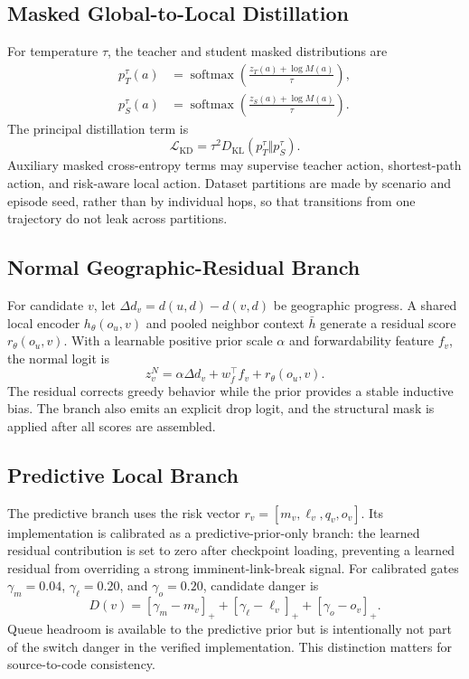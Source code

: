 \documentclass{ieeeaccess}
\newcommand{\VerifyEdit}[1]{\textcolor{ReviewBlue}{#1}}
\begin{document}
\subsection{Masked Global-to-Local Distillation}

For temperature $\tau$, the teacher and student masked distributions are
\begin{equation}
\begin{aligned}
p_T^\tau(a)&=\operatorname{softmax}\!\left(\frac{z_T(a)+\log M(a)}{\tau}\right),\\
p_S^\tau(a)&=\operatorname{softmax}\!\left(\frac{z_S(a)+\log M(a)}{\tau}\right).
\end{aligned}
\end{equation}
The principal distillation term is \cite{hinton2015distilling}
\begin{equation}
\mathcal{L}_{\mathrm{KD}}=\tau^2D_{\mathrm{KL}}(p_T^\tau\Vert p_S^\tau).
\end{equation}
Auxiliary masked cross-entropy terms may supervise teacher action, shortest-path action, and risk-aware local action. Dataset partitions are made by scenario and episode seed, rather than by individual hops, so that transitions from one trajectory do not leak across partitions.

\subsection{Normal Geographic-Residual Branch}

For candidate $v$, let $\Delta d_v=d(u,d)-d(v,d)$ be geographic progress. A shared local encoder $h_\theta(o_u,v)$ and pooled neighbor context $\bar h$ generate a residual score $r_\theta(o_u,v)$. With a learnable positive prior scale $\alpha$ and forwardability feature $f_v$, the normal logit is
\begin{equation}
z^N_v=\alpha\Delta d_v+w_f^\top f_v+r_\theta(o_u,v).
\end{equation}
The residual corrects greedy behavior while the prior provides a stable inductive bias. The branch also emits an explicit drop logit, and the structural mask is applied after all scores are assembled.

\subsection{Predictive Local Branch}

The predictive branch uses the risk vector $r_v=[m_v,\ell_v,q_v,o_v]$. Its implementation is calibrated as a predictive-prior-only branch: the learned residual contribution is set to zero after checkpoint loading, preventing a learned residual from overriding a strong imminent-link-break signal. For calibrated gates \VerifyEdit{$\gamma_m=0.04$, $\gamma_\ell=0.20$, and $\gamma_o=0.20$}, candidate danger is
\begin{equation}
D(v)=[\gamma_m-m_v]_+ + [\gamma_\ell-\ell_v]_+ + [\gamma_o-o_v]_+.
\label{eq:danger}
\end{equation}
Queue headroom is available to the predictive prior but is intentionally not part of the switch danger in the verified implementation. This distinction matters for source-to-code consistency.
\end{document}
